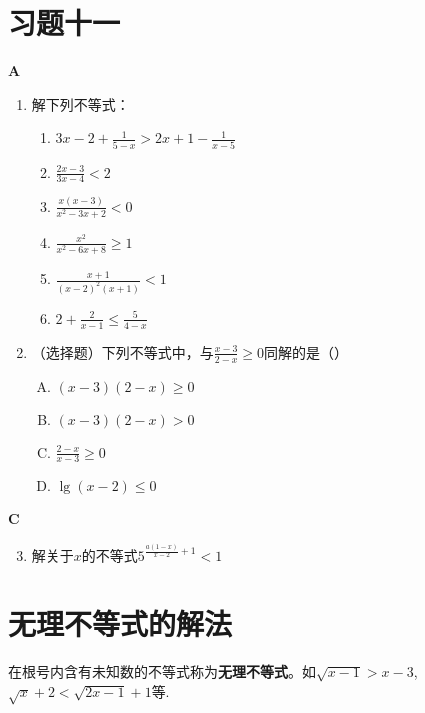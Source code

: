 \section*{习题十一}
\begin{center}
    \bfseries A
\end{center}

\begin{enumerate}
    \item 解下列不等式：
\begin{multicols}{2}
\begin{enumerate}[(1)]
    \item $3x-2+\frac{1}{5-x}>2x+1-\frac{1}{x-5}$
    \item $\frac{2x-3}{3x-4}<2$
    \item $\frac{x(x-3)}{x^2-3x+2}<0$
    \item $\frac{x^2}{x^2-6x+8}\ge 1$
    \item $\frac{x+1}{(x-2)^2 (x+1)}<1$
    \item $2+\frac{2}{x-1}\le \frac{5}{4-x}$
\end{enumerate}
\end{multicols}

\item （选择题）下列不等式中，与$\frac{x-3}{2-x}\ge 0$同解的是（\qquad ）
\begin{multicols}{2}
\begin{enumerate}[(A)]
    \item $(x-3)(2-x)\ge 0$
    \item $(x-3)(2-x)>0$
    \item $\frac{2-x}{x-3}\ge 0$
    \item $\lg(x-2)\le 0$
\end{enumerate}
\end{multicols}
\end{enumerate}

\begin{center}
    \bfseries C
\end{center}
\begin{enumerate}
 \setcounter{enumi}{2}   
 \item 解关于$x$的不等式$5^{\tfrac{a(1-x)}{x-2}+1}<1$
\end{enumerate}

\section{无理不等式的解法}
在根号内含有未知数的不等式称为\textbf{无理不等式}。如$\sqrt{x-1}>x-3$, $\sqrt{x}+2<\sqrt{2x-1}+1$等.

